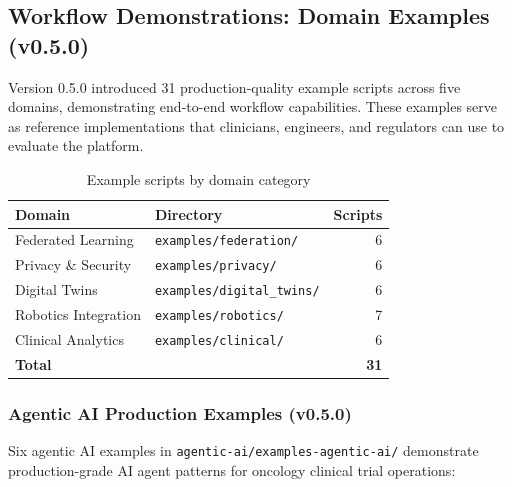 \subsection{Workflow Demonstrations: Domain Examples (v0.5.0)}
\label{sec:examples}

Version 0.5.0 introduced 31 production-quality example scripts across five domains, demonstrating end-to-end workflow capabilities. These examples serve as reference implementations that clinicians, engineers, and regulators can use to evaluate the platform.

\begin{table}[H]
\centering
\caption{Example scripts by domain category}
\label{tab:examples}
\small
\begin{tabular}{@{}llr@{}}
\toprule
\textbf{Domain} & \textbf{Directory} & \textbf{Scripts} \\
\midrule
Federated Learning & \texttt{examples/federation/} & 6 \\
Privacy \& Security & \texttt{examples/privacy/} & 6 \\
Digital Twins & \texttt{examples/digital\_twins/} & 6 \\
Robotics Integration & \texttt{examples/robotics/} & 7 \\
Clinical Analytics & \texttt{examples/clinical/} & 6 \\
\midrule
\textbf{Total} & & \textbf{31} \\
\bottomrule
\end{tabular}
\end{table}

\subsubsection{Agentic AI Production Examples (v0.5.0)}

Six agentic AI examples in \texttt{agentic-ai/examples-agentic-ai/} demonstrate production-grade AI agent patterns for oncology clinical trial operations:

